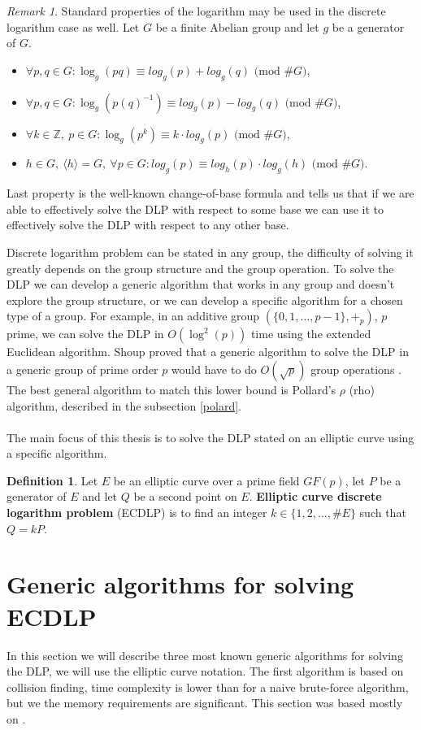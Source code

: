 \documentclass[thesis=M,english]{FITthesis}[2012/10/20]
\theoremstyle{remark}
\newtheorem*{RM}{Remark}
\theoremstyle{definition}
\newtheorem{DF}{Definition}[section]
\begin{document}
\begin{RM}
Standard properties of the logarithm may be used in the discrete logarithm case as well. Let $G$ be a finite Abelian group and let $g$ be a generator of $G$.
\begin{itemize}
\item $\forall p, q \in G: \log_g(pq) \equiv log_g(p) + log_g(q) \text{ (mod $\#G$)}$,
\item $\forall p, q \in G: \log_g(p(q)^{-1}) \equiv log_g(p) - log_g(q) \text{ (mod $\#G$)}$,
\item $\forall k \in \mathbb{Z},\ p \in G: \log_g(p^k) \equiv k \cdot log_g(p) \text{ (mod $\#G$)}$,
\item $h \in G,\ \langle h \rangle = G,\ \forall p \in G: log_g(p) \equiv log_h(p) \cdot log_g(h)  \text{ (mod $\#G$)}$.
\end{itemize}
Last property is the well-known change-of-base formula and tells us that if we are able to effectively solve the DLP with respect to some base we can use it to effectively solve the DLP with respect to any other base.
\end{RM}

\noindent Discrete logarithm problem can be stated in any group, the difficulty of solving it greatly depends on the group structure and the group operation. To solve the DLP we can develop a generic algorithm that works in any group and doesn't explore the group structure, or we can develop a specific algorithm for a chosen type of a group. For example, in an additive group $(\{0,1,\ldots, p-1\}, +_p)$, $p$ prime, we can solve the DLP in $O(\log^2(p))$ time using the extended Euclidean algorithm. Shoup proved that a generic algorithm to solve the DLP in a generic group of prime order $p$ would have to do $O(\sqrt{p})$ group operations \cite{shoup}. The best general algorithm to match this lower bound is Pollard's $\rho$ (rho) algorithm, described in the subsection \ref{polard}. 
\\
\\
\noindent The main focus of this thesis is to solve the DLP stated on an elliptic curve using a specific algorithm. 
\begin{DF}
Let $E$ be an elliptic curve over a prime field $GF(p)$, let $P$ be a generator of $E$ and let $Q$ be a second point on $E$. \textbf{Elliptic curve discrete logarithm problem} (ECDLP) is to find an integer $k \in \{1,2,\ldots	, \#E\}$ such that $Q = kP$.
\end{DF}
\section{Generic algorithms for solving ECDLP}
In this section we will describe three most known generic algorithms for solving the DLP, we will use the elliptic curve notation. The first algorithm is based on collision finding, time complexity is lower than for a naive brute-force algorithm, but we the memory requirements are significant. This section was based mostly on \cite{mky}.
\end{document}
